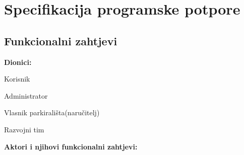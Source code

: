 \chapter{Specifikacija programske potpore}
		
	\section{Funkcionalni zahtjevi}
			
			
			\noindent \textbf{Dionici:}
			
			\begin{packed_enum}
				
				\item Korisnik
				\item Administrator				
				\item Vlasnik parkirališta(naručitelj)
				\item Razvojni tim
				
			\end{packed_enum}
			
			\noindent \textbf{Aktori i njihovi funkcionalni zahtjevi:}
			
